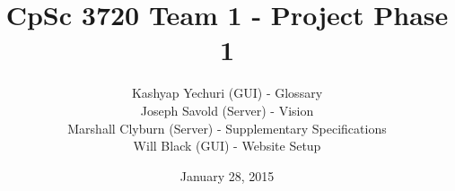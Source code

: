 \documentclass[11pt,openany]{report}
\begin{document}
\title{{\Huge CpSc 3720 Team 1 - Project Phase 1}}
\author{Kashyap Yechuri (GUI) - Glossary\\
Joseph Savold (Server) - Vision\\
Marshall Clyburn (Server) - Supplementary Specifications\\
Will Black (GUI) - Website Setup}
\date{January 28, 2015}
\maketitle





\end{document}
